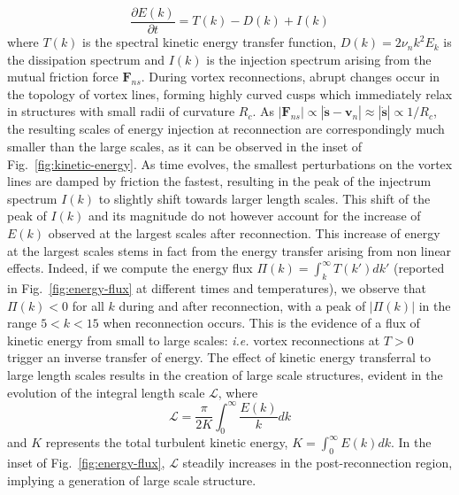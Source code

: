 \documentclass[%
 reprint,
 amsmath,amssymb,
 aps,
 prl,
]{revtex4-2}
\def \s{\mathbf{s}}
\def \v{\mathbf{v}}
\def \k{\mathbf{k}}
\begin{document}
{\begin{equation}
    \frac{\partial E(k)}{\partial t} = T(k) - D(k) + I(k)
\end{equation}
where $T(k)$ is the spectral kinetic energy transfer function,
$D(k)=2\nu_n k^2 E_k$ is the dissipation spectrum and
$I(k)$ is the injection spectrum arising from the mutual friction force $\mathbf{F}_{ns}$. During vortex reconnections, abrupt changes occur in the 
topology of vortex lines, forming highly curved cusps which immediately relax in structures with small radii of curvature $R_c$. 
As $|\mathbf{F}_{ns}| \propto  |\dot{\s}-\v_n| \approx |\dot{\s}| \propto 1/R_c$, the resulting scales of energy injection at reconnection are correspondingly much smaller than the large scales, as it can be observed in the inset of Fig.~\ref{fig:kinetic-energy}. 
As time evolves, the smallest perturbations on the vortex lines are damped by friction the fastest, resulting in the peak of the injectrum spectrum $I(k)$ to slightly shift towards larger length scales. This shift of the peak of $I(k)$ and its magnitude do not however account 
for the increase of $E(k)$ observed at the largest scales after reconnection. This increase of energy at the largest scales stems in fact from 
the energy transfer arising from non linear effects. Indeed, if we compute the energy flux $\displaystyle \Pi(k) = \int_{k}^{\infty}T(k') dk'$ (reported in Fig.~\ref{fig:energy-flux} at different times and temperatures), we observe that $\Pi(k) < 0$ for all $k$ during and after reconnection, 
with a peak of $|\Pi(k)|$ in the range $5 < k < 15$ when reconnection occurs. This is the evidence of a flux of kinetic energy from small to large scales: 
\textit{i.e.} vortex reconnections at $T>0$ trigger an inverse transfer of energy. The effect of kinetic energy transferral to large length scales results in the creation of large scale structures, evident in the evolution of the integral length scale $\mathcal{L}$, where
\begin{equation}
    \mathcal{L} = \frac{\pi}{2 K}\int_0^{\infty}\frac{E(k)}{k}dk
\end{equation}
and $K$ represents the total turbulent kinetic energy, $K=\int_0^{\infty}\!\!E(k)dk$. In the inset of Fig.~\ref{fig:energy-flux}, $\mathcal{L}$ steadily increases in the post-reconnection region, implying a generation of large scale structure. 

}
\end{document}
